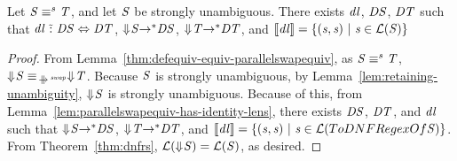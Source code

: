\documentclass[acmsmall]{acmart}
\begin{document}
\begin{lemma}
  \label{lem:identity-definitional-equivalence}
  Let $\mathit{S} \equiv^s \mathit{T}$, and let $\mathit{S}$ be strongly
  unambiguous.  There exists $\mathit{dl}$, $\mathit{DS}$, $\mathit{DT}$ such that
  $\mathit{dl} \,\,\tilde{:}\,\, \mathit{DS} \Leftrightarrow \mathit{DT}$,
  $\Downarrow\mkern-4mu \mathit{S} {\rightarrow}^* \mathit{DS}$,
  $\Downarrow\mkern-4mu \mathit{T} {\rightarrow}^* \mathit{DT}$, and
  $[ \! [\mathit{dl}] \! ] =
  \{(\mathit{s},\mathit{s}) ~|~ \mathit{s}\in\mathcal{L}(\mathit{S})\}$
\end{lemma}
\begin{proof}
  From Lemma~\ref{thm:defequiv-equiv-parallelswapequiv}, as 
  $\mathit{S} \equiv^s \mathit{T}$,
  $\ToDNFRegexOf{\Regex} \EquivalenceOf{\ParallelRewriteSwap}
  \ToDNFRegexOf{\RegexAlt}$.
  Because $\mathit{S}$ is strongly unambiguous, by
  Lemma~\ref{lem:retaining-unambiguity}, $\Downarrow\mkern-4mu \mathit{S}$ is strongly
  unambiguous.
  Because of this, from Lemma~\ref{lem:parallelswapequiv-has-identity-lens},
  there exists $\mathit{DS}$, $\mathit{DT}$, and $\mathit{dl}$ such that
  $\Downarrow\mkern-4mu \mathit{S} {\rightarrow}^* \mathit{DS}$,
  $\Downarrow\mkern-4mu \mathit{T} {\rightarrow}^* \mathit{DT}$, and
  $[ \! [\mathit{dl}] \! ] =
  \{(\mathit{s},\mathit{s}) ~|~
    \mathit{s}\in\mathcal{L}(ToDNFRegexOf{\mathit{S}})\}$.
  From Theorem~\ref{thm:dnfrs}, $\mathcal{L}(\Downarrow\mkern-4mu \mathit{S}) =
  \mathcal{L}(\mathit{S})$, as desired.
\end{proof}
\end{document}
